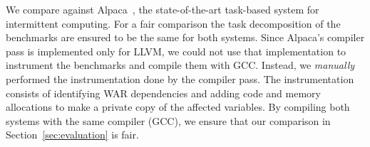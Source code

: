 We compare \sys against Alpaca~\cite{alpaca}, the state-of-the-art task-based system for intermittent computing. For a fair comparison the task decomposition of the benchmarks are ensured to be the same for both systems.
%
Since Alpaca's compiler pass is implemented only for LLVM, we could not use that implementation to instrument the benchmarks and compile them with GCC. Instead, we \emph{manually} performed the instrumentation done by the compiler pass. The instrumentation consists of identifying WAR dependencies  and adding code and memory allocations to make a private copy of the affected variables.
%
%
%
By compiling both systems with the same compiler (GCC), we ensure that our comparison in Section~\ref{sec:evaluation} is fair.
